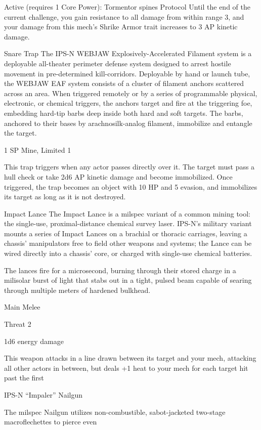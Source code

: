   Active (requires 1 Core Power):
  Tormentor spines
  Protocol
  Until the end of the current challenge, you gain resistance to all damage from within range 3, and your
  damage from this mech’s Shrike Armor trait increases to 3 AP kinetic damage.

Snare Trap
The IPS-N WEBJAW Explosively-Accelerated Filament system is a deployable all-theater perimeter
defense system designed to arrest hostile movement in pre-determined kill-corridors. Deployable by hand
or launch tube, the WEBJAW EAF system consists of a cluster of filament anchors scattered across an
area. When triggered remotely or by a series of programmable physical, electronic, or chemical triggers, the
anchors target and fire at the triggering foe, embedding hard-tip barbs deep inside both hard and soft
targets. The barbs, anchored to their bases by arachnosilk-analog filament, immobilize and entangle the
target.




1 SP
Mine, Limited 1

This trap triggers when any actor passes directly over it. The target must pass a hull check or
take 2d6 AP kinetic damage and become immobilized. Once triggered, the trap becomes an
object with 10 HP and 5 evasion, and immobilizes its target as long as it is not destroyed.


Impact Lance
The Impact Lance is a milspec variant of a common mining tool: the single-use, proximal-distance chemical
survey laser. IPS-N’s military variant mounts a series of Impact Lances on a brachial or thoracic carriages,
leaving a chassis’ manipulators free to field other weapons and systems; the Lance can be wired directly
into a chassis’ core, or charged with single-use chemical batteries.

The lances fire for a microsecond, burning through their stored charge in a milisolar burst of light that stabs
out in a tight, pulsed beam capable of searing through multiple meters of hardened bulkhead.

Main Melee

Threat 2

1d6 energy damage

This weapon attacks in a line drawn between its target and your mech, attacking all other actors
in between, but deals +1 heat to your mech for each target hit past the first


IPS-N “Impaler” Nailgun

The milspec Nailgun utilizes non-combustible, sabot-jacketed two-stage macroflechettes to pierce even

